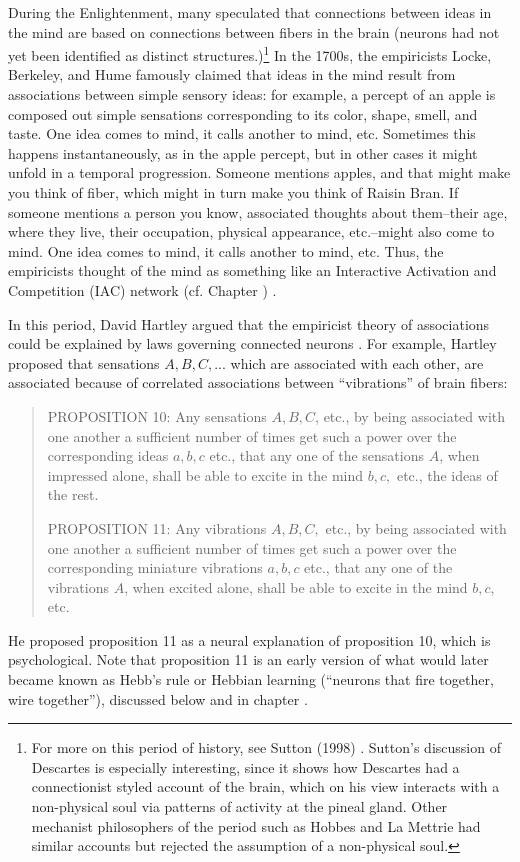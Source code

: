 During the Enlightenment, many speculated that connections between ideas in the mind are based on connections between fibers in the brain (neurons had not yet been identified as distinct structures.)\footnote{For more on this period of history, see Sutton (1998) \cite{sutton1998philosophy}. Sutton's discussion of Descartes is especially interesting, since it shows how Descartes had a connectionist styled account of the brain, which on his view  interacts with a non-physical soul via patterns of activity at the pineal gland. Other mechanist philosophers of the period such as Hobbes and La Mettrie had similar accounts but rejected the assumption of a non-physical soul.} In the 1700s, the empiricists Locke, Berkeley, and Hume famously claimed that ideas in the mind result from associations between simple sensory ideas: for example, a percept of an apple is composed out simple sensations corresponding to its color, shape, smell, and taste. One idea comes to mind, it calls another to mind, etc. Sometimes this happens instantaneously, as in the apple percept, but in other cases it might unfold in a temporal progression. Someone mentions apples, and that might make you think of fiber, which might in turn make you think of Raisin Bran. If someone mentions a person you know, associated thoughts about them--their age, where they live, their occupation, physical appearance, etc.--might also come to mind. One idea comes to mind, it calls another to mind, etc. Thus, the empiricists thought of the mind as something like an Interactive Activation and Competition (IAC) network (cf. Chapter ) \cite{bain1873mind}.

In this period, David Hartley argued that the empiricist theory of associations could be explained by laws governing connected neurons \cite{hartley1749observations, bain1873mind}. For example, Hartley \cite{hartley1749observations} proposed that sensations $A,B,C,...$ which are associated with each other, are associated because of correlated associations between ``vibrations'' of brain fibers:
\begin{quotation}
PROPOSITION 10: Any sensations $A, B, C$, etc., by being associated with one another a sufficient number of times get such a  power over the corresponding ideas $a, b, c$ etc., that any one of the sensations $A$, when impressed alone, shall be able to excite in the mind $b, c,$ etc., the ideas of the rest.

PROPOSITION 11: Any vibrations $A, B, C,$ etc., by being associated with one another a sufficient number of times get such a  power over the corresponding miniature vibrations $a, b, c$ etc., that any one of the vibrations $A$, when excited alone, shall be able to excite in the mind $b, c$, etc. 
\end{quotation}
He proposed proposition 11 as a neural explanation of proposition 10, which is psychological. Note that proposition 11 is an early version of what would later became known as Hebb's rule or Hebbian learning (``neurons that fire together, wire together''), discussed below and in chapter .

